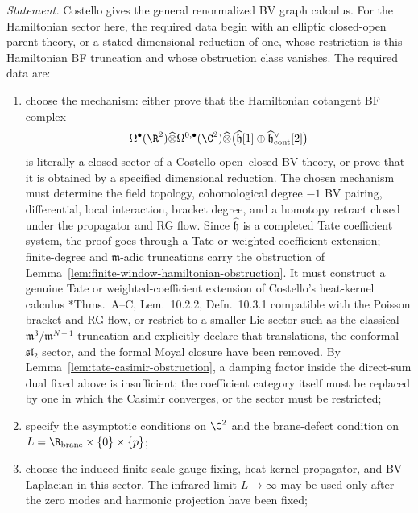 \documentclass[11pt]{memoir}
\begin{document}
\begin{prob}
  \noindent\emph{Statement.}
  Costello gives the general renormalized BV graph calculus. For
  the Hamiltonian sector here, the required data begin with an elliptic
  closed-open parent theory, or a stated dimensional reduction of one,
  whose restriction is this Hamiltonian BF truncation and whose obstruction
  class vanishes. The required data are:
  \begin{enumerate}
    \item choose the mechanism: either prove that the Hamiltonian cotangent BF
      complex
      $$\Omega^\bullet(\R^2)\widehat\otimes
        \Omega^{0,\bullet}(\C^2)\widehat\otimes
        \bigl(\widehat{\mathfrak h}[1]\oplus
        \widehat{\mathfrak h}^{\vee}_{\mathrm{cont}}[2]\bigr)$$
      is literally a closed sector of a Costello open--closed BV theory, or
      prove that it is obtained by a specified dimensional reduction. The chosen
      mechanism must determine the field topology, cohomological
      degree \(-1\) BV pairing, differential, local interaction, bracket
      degree, and a homotopy retract
      closed under the propagator and RG flow. Since
      $\widehat{\mathfrak h}$ is a completed Tate coefficient system, the proof
	      goes through a Tate or weighted-coefficient extension; finite-degree
      and $\mathfrak m$-adic truncations carry the obstruction of
      Lemma~\ref{lem:finite-window-hamiltonian-obstruction}. It must
      construct a genuine Tate or weighted-coefficient extension of Costello's
      heat-kernel calculus
      \cite{costello-renormalization}*{Thms.~A--C, Lem.~10.2.2,
      Defn.~10.3.1} compatible with the Poisson bracket
      and RG flow, or restrict to a smaller Lie sector such as the
      classical $\mathfrak m^3/\mathfrak m^{N+1}$ truncation and
      explicitly declare that translations, the conformal
      $\mathfrak{sl}_2$ sector, and the formal Moyal closure have
      been removed. By
      Lemma~\ref{lem:tate-casimir-obstruction}, a damping factor inside the
      direct-sum dual fixed above is insufficient; the coefficient category
      itself must be replaced by one in which the Casimir converges, or the
      sector must be restricted;
    \item specify the asymptotic conditions on $\C^2$ and the brane-defect
      condition on \(L=\R_{\mathrm{brane}}\times\{0\}\times\{p\}\);
    \item choose the induced finite-scale gauge fixing, heat-kernel propagator,
      and BV Laplacian in this sector. The infrared limit $L\to\infty$ may be
      used only after the zero modes and harmonic projection have been fixed;

\end{enumerate}
\end{prob}
\end{document}
